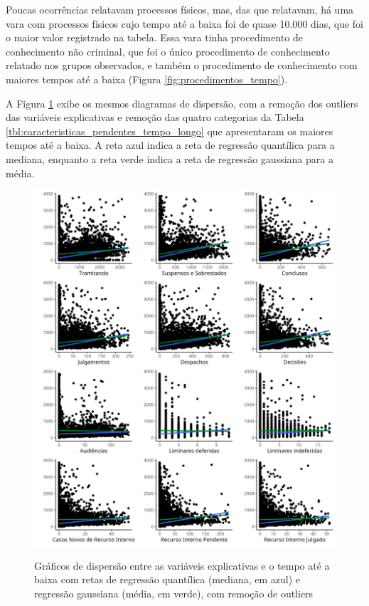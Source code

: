 Poucas ocorrências relatavam processos físicos, mas, das que relatavam, há uma vara com processos físicos cujo tempo até a baixa foi de quase 10.000 dias, que foi o maior valor registrado na tabela. Essa vara tinha procedimento de conhecimento não criminal, que foi o único procedimento de conhecimento relatado nos grupos observados, e também o procedimento de conhecimento com maiores tempos até a baixa (Figura \ref{fig:procedimentos_tempo}).

A Figura \ref{fig:cross_charts_without_outliers} exibe os mesmos diagramas de dispersão, com a remoção dos outliers das variáveis explicativas e remoção das quatro categorias da Tabela \ref{tbl:caracteristicas_pendentes_tempo_longo} que apresentaram os maiores tempos até a baixa. A reta azul indica a reta de regressão quantílica para a mediana, enquanto a reta verde indica a reta de regressão gaussiana para a média.

\begin{figure}[H]
    \centering
    
    \caption{Gráficos de dispersão entre as variáveis explicativas e o tempo até a baixa com retas de regressão quantílica (mediana, em azul) e regressão gaussiana (média, em verde), com remoção de outliers}
    \includegraphics[scale=.74]{imagens/cross_charts_without_outliers.png}
    \label{fig:cross_charts_without_outliers}
\end{figure}

